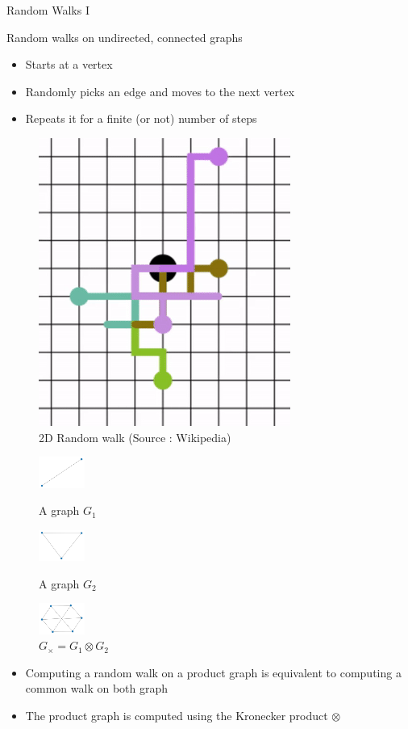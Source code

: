 \documentclass[compress]{beamer}
\begin{document}
\begin{frame}{Random Walks I}
\begin{multicols}{2}
	Random walks on undirected, connected graphs 
	\begin{itemize}
		\item Starts at a vertex
		\item Randomly picks an edge and moves to the next vertex
		\item Repeats it for a finite (or not) number of steps
	\end{itemize}
	\begin{figure}
		\includegraphics[height=.25\textheight]{data/randomwalk.png}
		\caption*{2D Random walk (Source : Wikipedia)}
	\end{figure}
\end{multicols}
\vspace*{-0.8cm}
\begin{figure}
\begin{multicols}{3}
\includegraphics[width=1.5cm]{data/prod_graph/g1.png}\caption*{A graph $G_1$}\par
\includegraphics[width=1.5cm]{data/prod_graph/g2.png}\caption*{A graph $G_2$}\par
\includegraphics[width=1.5cm]{data/prod_graph/gx.png}\caption*{$G_{\times}=G_1 \otimes G_2$}\par
\end{multicols}
\end{figure}
\begin{itemize}
	\item Computing a random walk on a product graph is equivalent to computing a common walk on both graph \citep{imrich2000product}
	\item The product graph is computed using the Kronecker product $\otimes$
\end{itemize}
\end{frame}
\end{document}
